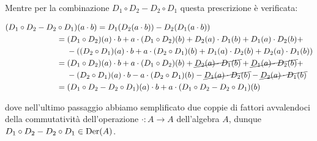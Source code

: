 Mentre per la combinazione $ D_{1} \circ D_{2} - D_{2} \circ D_{1} $ questa prescrizione è verificata:

\begin{align}
	\begin{split}
		(D_{1} \circ D_{2} - D_{2} &\circ D_{1})(a \cdot b) = D_{1}(D_{2}(a \cdot b)) - D_{2}(D_{1}(a \cdot b))\\
		&= (D_{1} \circ D_{2})(a) \cdot b + a \cdot (D_{1} \circ D_{2})(b) + D_{2}(a) \cdot D_{1}(b) + D_{1}(a) \cdot D_{2}(b) +\\
		& \hal - ((D_{2} \circ D_{1})(a) \cdot b + a \cdot (D_{2} \circ D_{1})(b) + D_{1}(a) \cdot D_{2}(b) + D_{2}(a) \cdot D_{1}(b))\\
		&= (D_{1} \circ D_{2})(a) \cdot b + a \cdot (D_{1} \circ D_{2})(b) + \cancel{ D_{2}(a) \cdot D_{1}(b) } + \cancel{ D_{1}(a) \cdot D_{2}(b) } +\\
		& \hal - (D_{2} \circ D_{1})(a) \cdot b - a \cdot (D_{2} \circ D_{1})(b) - \cancel{ D_{1}(a) \cdot D_{2}(b) } - \cancel{ D_{2}(a) \cdot D_{1}(b) }\\
		&= (D_{1} \circ D_{2} - D_{2} \circ D_{1})(a) \cdot b + a \cdot (D_{1} \circ D_{2} - D_{2} \circ D_{1})(b)
	\end{split}
\end{align}

dove nell'ultimo passaggio abbiamo semplificato due coppie di fattori avvalendoci della commutatività dell'operazione $ \cdot : A \to A $ dell'algebra $ A $, dunque $ D_{1} \circ D_{2} - D_{2} \circ D_{1} \in \operatorname{Der}(A) $.

